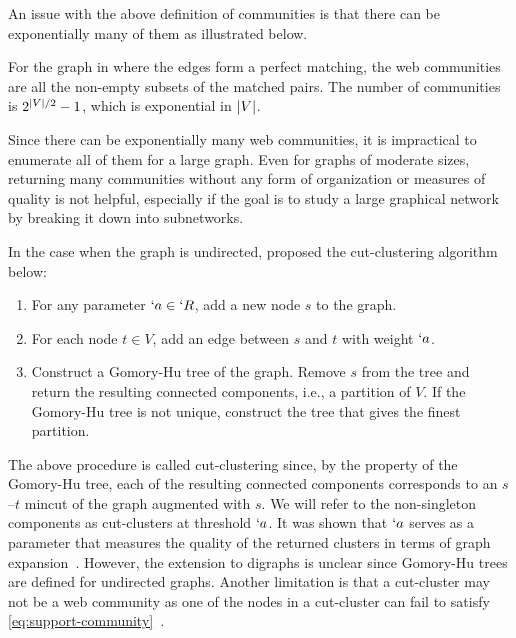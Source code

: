 An issue with the above definition of communities is that there can be exponentially many of them as illustrated below.

\begin{example}
  \label{eg:too-many-communities}
  For the graph in  where the edges form a perfect matching, the web communities are all the non-empty subsets of the matched pairs. The number of communities is $2^{\lvert V\rvert/2}-1$, which is exponential in $\lvert V\rvert$.
\end{example}

Since there can be exponentially many web communities, it is impractical to enumerate all of them for a large graph. Even for graphs of moderate sizes, returning many communities without any form of organization or measures of quality is not helpful, especially if the goal is to study a large graphical network by breaking it down into subnetworks. 

In the case when the graph is undirected, \cite{flake:cut-clustering} proposed the cut-clustering algorithm below: 
\begin{enumerate}
\item For any parameter $`a\in `R$, add a new node $s$ to the graph.
\item For each node $t\in V$, add an edge between $s$ and $t$ with weight $`a$.
\item Construct a Gomory-Hu tree of the graph. Remove $s$ from the tree and return the resulting connected components, i.e., a partition of $V$. If the Gomory-Hu tree is not unique, construct the tree that gives the finest partition.
\end{enumerate}
The above procedure is called cut-clustering since, by the property of the Gomory-Hu tree, each of
the resulting connected components corresponds to an $s$--$t$ mincut of the graph augmented with
$s$.  We will refer to the non-singleton components as cut-clusters at threshold $`a$. It was shown
that $`a$ serves as a parameter that measures the quality of the returned clusters in terms of graph
expansion~\cite[(3.3)]{flake:cut-clustering}. However, the extension to digraphs is unclear since
Gomory-Hu trees are defined for undirected graphs. Another limitation is that a cut-cluster may not
be a web community as one of the nodes in a cut-cluster can fail to satisfy
\eqref{eq:support-community}~\cite[Lemma~3.1]{flake:cut-clustering}.
